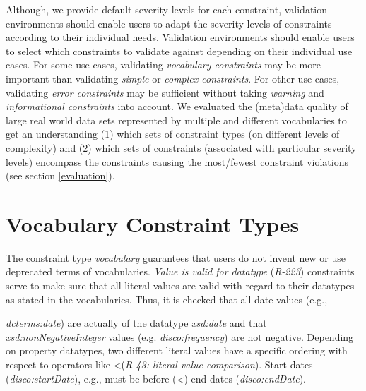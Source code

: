 \documentclass{llncs}
\newcommand{\tb}[1]{\todo[size=\small, color=green!40]{\textbf{Thomas:} #1}}
\begin{document}
{Although, we provide default severity levels for each constraint, validation environments should enable users to adapt the severity levels of constraints according to their individual needs.
Validation environments should enable users to select which constraints to validate against depending on their individual use cases.
For some use cases, 
validating \emph{vocabulary constraints} may be more important than validating \emph{simple} or \emph{complex constraints}.
For other use cases,
validating \emph{error constraints} may be sufficient without taking \emph{warning} and \emph{informational constraints} into account.
We evaluated the (meta)data quality of large real world data sets represented by multiple and different vocabularies to get an understanding  
(1) which sets of constraint types (on different levels of complexity) and 
(2) which sets of constraints (associated with particular severity levels) encompass the constraints causing the most/fewest constraint violations (see section \ref{evaluation}).

%
%
%

%


\section{Vocabulary Constraint Types}
\label{vocabulary-constraint-types}

The constraint type \emph{vocabulary} guarantees that users do not invent new or use deprecated terms of vocabularies.
\emph{Value is valid for datatype} (\emph{R-223}) constraints serve to make sure that all literal values are valid with regard to their datatypes - as stated in the vocabularies.
Thus, it is checked that all date values (e.g., {{\em dcterms:date}) are actually of the datatype \emph{xsd:date} and that \emph{xsd:nonNegativeInteger} values (e.g. \emph{disco:frequency}) are not negative.
Depending on property datatypes, two different literal values have
a specific ordering with respect to operators like \textless  (\emph{R-43: literal value comparison}).
Start dates (\emph{disco:startDate}), e.g., must be before (\emph{\textless}) end dates (\emph{disco:endDate}).

}}
\end{document}
